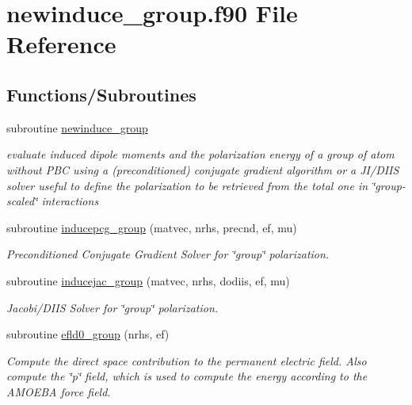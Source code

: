 \hypertarget{newinduce__group_8f90}{\section{newinduce\-\_\-group.\-f90 File Reference}
\label{newinduce__group_8f90}
}
\subsection*{Functions/\-Subroutines}
\begin{DoxyCompactItemize}
\item 
subroutine \hyperlink{newinduce__group_8f90_a3bef550067628ac344b171a34dde594f}{newinduce\-\_\-group}
\begin{DoxyCompactList}\small\item\em evaluate induced dipole moments and the polarization energy of a group of atom without P\-B\-C using a (preconditioned) conjugate gradient algorithm or a J\-I/\-D\-I\-I\-S solver useful to define the polarization to be retrieved from the total one in \char`\"{}group-\/scaled\char`\"{} interactions \end{DoxyCompactList}\item 
subroutine \hyperlink{newinduce__group_8f90_adeffcd38357ee16b4cb1359787fe08f9}{inducepcg\-\_\-group} (matvec, nrhs, precnd, ef, mu)
\begin{DoxyCompactList}\small\item\em Preconditioned Conjugate Gradient Solver for \char`\"{}group\char`\"{} polarization. \end{DoxyCompactList}\item 
subroutine \hyperlink{newinduce__group_8f90_a8d07446ffd185bcbf3449a23963ab46b}{inducejac\-\_\-group} (matvec, nrhs, dodiis, ef, mu)
\begin{DoxyCompactList}\small\item\em Jacobi/\-D\-I\-I\-S Solver for \char`\"{}group\char`\"{} polarization. \end{DoxyCompactList}\item 
subroutine \hyperlink{newinduce__group_8f90_a2bf8897cb57f2f2702b8014af010a796}{efld0\-\_\-group} (nrhs, ef)
\begin{DoxyCompactList}\small\item\em Compute the direct space contribution to the permanent electric field. Also compute the \char`\"{}p\char`\"{} field, which is used to compute the energy according to the A\-M\-O\-E\-B\-A force field. \end{DoxyCompactList}\item 

\end{DoxyCompactItemize}
